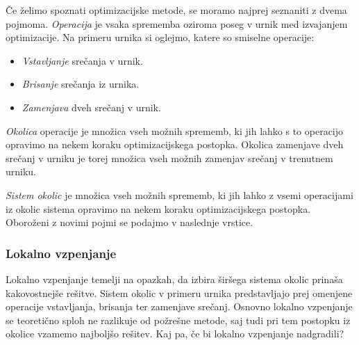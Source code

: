 \documentclass[10pt, a4paper]{article}
\begin{document}
Če želimo spoznati optimizacijske metode, se moramo najprej seznaniti z dvema pojmoma.
\emph{Operacija} je vsaka sprememba oziroma poseg v urnik med izvajanjem optimizacije.
Na primeru urnika si oglejmo, katere so smiselne operacije:
\begin{itemize}
   \item \emph{Vstavljanje} srečanja v urnik.
   \item \emph{Brisanje} srečanja iz urnika.
   \item \emph{Zamenjava} dveh srečanj v urnik.
\end{itemize}
\emph{Okolica} operacije je množica vseh možnih sprememb, ki jih lahko s to operacijo
opravimo na nekem koraku optimizacijskega postopka. Okolica zamenjave dveh srečanj v urniku
je torej množica vseh možnih zamenjav srečanj v trenutnem urniku.

\emph{Sistem okolic} je množica vseh možnih sprememb, ki jih lahko z vsemi operacijami iz
okolic sistema opravimo na nekem koraku optimizacijskega postopka. Oboroženi z novimi pojmi
se podajmo v naslednje vrstice.

\subsubsection{Lokalno vzpenjanje}

Lokalno vzpenjanje temelji na opazkah, da izbira širšega sistema okolic prinaša kakovostnejše
rešitve. Sistem okolic v primeru urnika predstavljajo prej omenjene operacije vstavljanja,
brisanja ter zamenjave srečanj. Osnovno lokalno vzpenjanje se teoretično sploh ne razlikuje
od požrešne metode, saj tudi pri tem postopku iz okolice vzamemo najboljšo rešitev. Kaj pa,
če bi lokalno vzpenjanje nadgradili?
\end{document}
